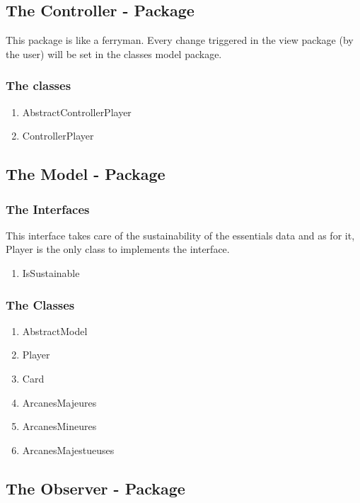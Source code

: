 \documentclass{article}
\begin{document}
\subsection{The Controller - Package}\label{the-controller---package}

This package is like a ferryman. Every change triggered in the view
package (by the user) will be set in the classes model package. \subsubsection{The classes}\label{the-classes}
\begin{enumerate}
    \item AbstractControllerPlayer
    \item ControllerPlayer
\end{enumerate}

\subsection{The Model - Package}\label{the-model---package}

\subsubsection{The Interfaces}\label{a---the-interfaces}
This interface takes care of the sustainability of the essentials data and as for it, Player is the only class to implements the interface.
\begin{enumerate}
    \item IsSustainable
\end{enumerate}

\subsubsection{ The Classes }\label{the-classes}
\begin{enumerate}
    \item AbstractModel
    \item Player
    \item Card
    \item ArcanesMajeures
    \item ArcanesMineures
    \item ArcanesMajestueuses
\end{enumerate} 

\subsection{The Observer - Package}\label{the-observer---package}
\end{document}
